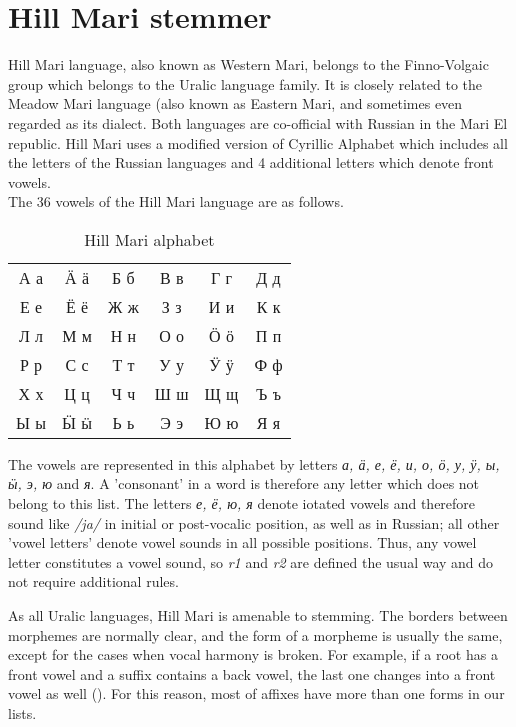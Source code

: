 \documentclass[a4paper,notitlepage]{article}
\begin{document}
\section{Hill Mari stemmer} \label{hm}

Hill Mari language, also known as Western Mari, belongs to the Finno-Volgaic group which belongs to the Uralic language family. It is closely related to the Meadow Mari language (also known as Eastern Mari, and sometimes even regarded as its dialect. Both languages are co-official with Russian in the Mari El republic. \newline
Hill Mari uses a modified version of Cyrillic Alphabet which includes all the letters of the Russian languages and 4 additional letters which denote front vowels. \\
The 36 vowels of the Hill Mari language are as follows.

\begin{table}[!h]
    \centering
    \begin{tabular}{cccccc}
         А а & Ӓ ӓ & Б б & В в & Г г & Д д \\
         Е е & Ё ё & Ж ж & З з & И и & К к \\
         Л л & М м & Н н & О о & Ӧ ӧ & П п \\
         Р р & С с & Т т & У у & Ӱ ӱ & Ф ф \\
         Х х & Ц ц & Ч ч & Ш ш & Щ щ & Ъ ъ \\
         Ы ы & Ӹ ӹ & Ь ь & Э э & Ю ю & Я я
    \end{tabular}
    \caption{Hill Mari alphabet}
    \label{tab:HM_alphabet}
\end{table}

The vowels are represented in this alphabet by letters \textit{а, ӓ, е, ё, и, о, ӧ, у, ӱ, ы, ӹ, э, ю} and \textit{я}. A 'consonant' in a word is therefore any letter which does not belong to this list. The letters \textit{е, ё, ю, я} denote iotated vowels and therefore sound like \textit{/ja/} in initial or post-vocalic position, as well as in Russian; all other 'vowel letters' denote vowel sounds in all possible positions. Thus, any vowel letter constitutes a vowel sound, so \emph{r1} and \emph{r2} are defined the usual way and do not require additional rules.\newline


As all Uralic languages, Hill Mari is amenable to stemming. The borders between morphemes are normally clear, and the form of a morpheme is usually the same, except for the cases when vocal harmony is broken. For example, if a root has a front vowel and a suffix contains a back vowel, the last one changes into a front vowel as well (\nextx). For this reason, most of affixes have more than one forms in our lists. \newline
\end{document}

